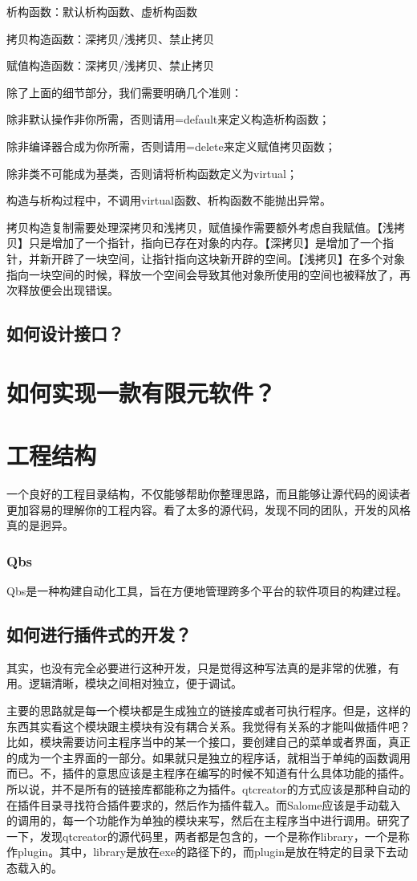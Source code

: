 析构函数：默认析构函数、虚析构函数

拷贝构造函数：深拷贝/浅拷贝、禁止拷贝

赋值构造函数：深拷贝/浅拷贝、禁止拷贝

除了上面的细节部分，我们需要明确几个准则：

除非默认操作非你所需，否则请用=default来定义构造析构函数；

除非编译器合成为你所需，否则请用=delete来定义赋值拷贝函数；

除非类不可能成为基类，否则请将析构函数定义为virtual；

构造与析构过程中，不调用virtual函数、析构函数不能抛出异常。

拷贝构造复制需要处理深拷贝和浅拷贝，赋值操作需要额外考虑自我赋值。【浅拷贝】只是增加了一个指针，指向已存在对象的内存。【深拷贝】是增加了一个指针，并新开辟了一块空间，让指针指向这块新开辟的空间。【浅拷贝】在多个对象指向一块空间的时候，释放一个空间会导致其他对象所使用的空间也被释放了，再次释放便会出现错误。

\subsection{如何设计接口？}
\section{如何实现一款有限元软件？}

\section{工程结构}
一个良好的工程目录结构，不仅能够帮助你整理思路，而且能够让源代码的阅读者更加容易的理解你的工程内容。看了太多的源代码，发现不同的团队，开发的风格真的是迥异。

\subsubsection{Qbs}
Qbs是一种构建自动化工具，旨在方便地管理跨多个平台的软件项目的构建过程。


\subsection{如何进行插件式的开发？}
其实，也没有完全必要进行这种开发，只是觉得这种写法真的是非常的优雅，有用。逻辑清晰，模块之间相对独立，便于调试。

主要的思路就是每一个模块都是生成独立的链接库或者可执行程序。但是，这样的东西其实看这个模块跟主模块有没有耦合关系。我觉得有关系的才能叫做插件吧？比如，模块需要访问主程序当中的某一个接口，要创建自己的菜单或者界面，真正的成为一个主界面的一部分。如果就只是独立的程序话，就相当于单纯的函数调用而已。不，插件的意思应该是主程序在编写的时候不知道有什么具体功能的插件。所以说，并不是所有的链接库都能称之为插件。qtcreator的方式应该是那种自动的在插件目录寻找符合插件要求的，然后作为插件载入。而Salome应该是手动载入的调用的，每一个功能作为单独的模块来写，然后在主程序当中进行调用。研究了一下，发现qtcreator的源代码里，两者都是包含的，一个是称作library，一个是称作plugin。其中，library是放在exe的路径下的，而plugin是放在特定的目录下去动态载入的。


